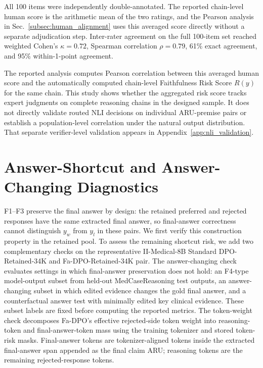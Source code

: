 \documentclass[a4paper,fleqn,doubleblind]{cas-sc}
\begin{document}
All 100 items were independently double-annotated. The reported chain-level human score is the arithmetic mean of the two ratings, and the Pearson analysis in Sec.~\ref{subsec:human_alignment} uses this averaged score directly without a separate adjudication step. Inter-rater agreement on the full 100-item set reached weighted Cohen's $\kappa=0.72$, Spearman correlation $\rho=0.79$, 61\% exact agreement, and 95\% within-1-point agreement.

The reported analysis computes Pearson correlation between this averaged human score and the automatically computed chain-level Faithfulness Risk Score $R(y)$ for the same chain. This study shows whether the aggregated risk score tracks expert judgments on complete reasoning chains in the designed sample. It does not directly validate routed NLI decisions on individual ARU-premise pairs or establish a population-level correlation under the natural output distribution. That separate verifier-level validation appears in Appendix~\ref{app:nli_validation}.

\section{Answer-Shortcut and Answer-Changing Diagnostics}
\label{app:answer_shortcut_diagnostics}

F1--F3 preserve the final answer by design: the retained preferred and rejected responses have the same extracted final answer, so final-answer correctness cannot distinguish $y_w$ from $y_l$ in these pairs. We first verify this construction property in the retained pool. To assess the remaining shortcut risk, we add two complementary checks on the representative II-Medical-8B Standard DPO-Retained-34K and Fa-DPO-Retained-34K pair. The answer-changing check evaluates settings in which final-answer preservation does not hold: an F4-type model-output subset from held-out MedCaseReasoning test outputs, an answer-changing subset in which edited evidence changes the gold final answer, and a counterfactual answer test with minimally edited key clinical evidence. These subset labels are fixed before computing the reported metrics. The token-weight check decomposes Fa-DPO's effective rejected-side token weight into reasoning-token and final-answer-token mass using the training tokenizer and stored token-risk masks. Final-answer tokens are tokenizer-aligned tokens inside the extracted final-answer span appended as the final claim ARU; reasoning tokens are the remaining rejected-response tokens.
\end{document}
